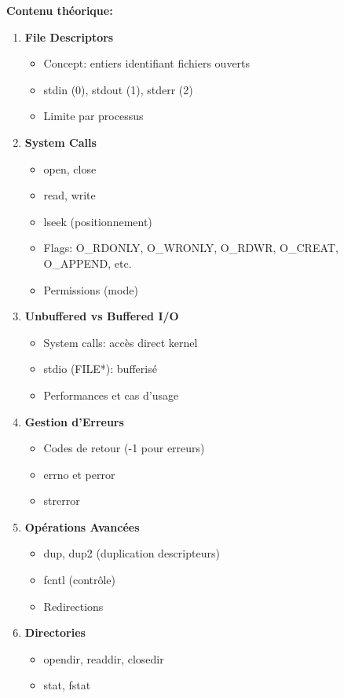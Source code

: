 \documentclass[10pt,a4paper]{article}
\begin{document}
\textbf{Contenu théorique:}
\begin{enumerate}
\item \textbf{File Descriptors}
   \begin{itemize}
   \item Concept: entiers identifiant fichiers ouverts
   \item stdin (0), stdout (1), stderr (2)
   \item Limite par processus
   \end{itemize}

\item \textbf{System Calls}
   \begin{itemize}
   \item open, close
   \item read, write
   \item lseek (positionnement)
   \item Flags: O\_RDONLY, O\_WRONLY, O\_RDWR, O\_CREAT, O\_APPEND, etc.
   \item Permissions (mode)
   \end{itemize}

\item \textbf{Unbuffered vs Buffered I/O}
   \begin{itemize}
   \item System calls: accès direct kernel
   \item stdio (FILE*): bufferisé
   \item Performances et cas d'usage
   \end{itemize}

\item \textbf{Gestion d'Erreurs}
   \begin{itemize}
   \item Codes de retour (-1 pour erreurs)
   \item errno et perror
   \item strerror
   \end{itemize}

\item \textbf{Opérations Avancées}
   \begin{itemize}
   \item dup, dup2 (duplication descripteurs)
   \item fcntl (contrôle)
   \item Redirections
   \end{itemize}

\item \textbf{Directories}
   \begin{itemize}
   \item opendir, readdir, closedir
   \item stat, fstat
   \end{itemize}
\end{enumerate}
\end{document}
